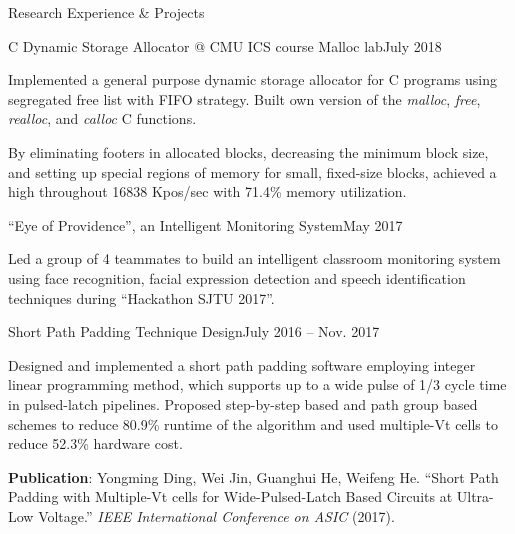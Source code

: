 \documentclass{resume_ucla} %
\begin{document}
\begin{rSection}{Research Experience \& Projects}
\begin{rSubsection}{C Dynamic Storage Allocator @ CMU ICS course Malloc lab}{July 2018}{}{}
\item Implemented a general purpose dynamic storage allocator for C programs using segregated free list with FIFO strategy. Built own version of the \emph{malloc}, \emph{free}, \emph{realloc}, and \emph{calloc} C functions. 
\item By eliminating footers in allocated blocks, decreasing the minimum block size, and setting up special regions of memory for small, fixed-size blocks, achieved a high throughout 16838 Kpos/sec with 71.4\% memory utilization.
\end{rSubsection}

\begin{rSubsection}{``Eye of Providence'', an Intelligent Monitoring System}{May 2017}{}{}
\item Led a group of 4 teammates to build an intelligent classroom monitoring system using face recognition, facial expression detection and speech identification techniques during ``Hackathon SJTU 2017''.
\end{rSubsection}

\begin{rSubsection}{Short Path Padding Technique Design}{July 2016 -- Nov. 2017}{}{}
\item Designed and implemented a short path padding software employing integer linear programming method, which supports up to a wide pulse of 1/3 cycle time in pulsed-latch pipelines. Proposed step-by-step based and path group based schemes to reduce 80.9\% runtime of the algorithm and used multiple-Vt cells to reduce 52.3\% hardware cost.
\item \textbf{Publication}: Yongming Ding, Wei Jin, Guanghui He, Weifeng He.  ``Short Path Padding with Multiple-Vt cells for Wide-Pulsed-Latch Based Circuits at Ultra-Low Voltage.'' \emph{IEEE International Conference on ASIC}  (2017).
\end{rSubsection}

\end{rSection}







\end{document}
